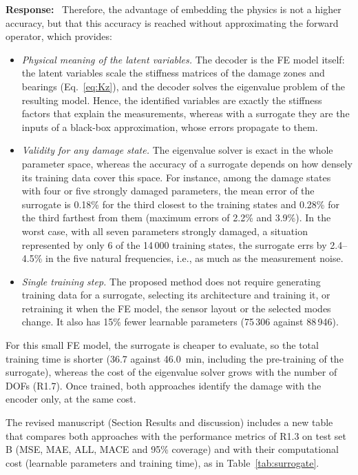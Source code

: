 \documentclass[11pt]{article}
\newenvironment{response}{\par\smallskip\noindent\color{resp}\textbf{Response:}\ }{\par}
\begin{document}
\begin{response}
	Therefore, the advantage of embedding the physics is not a higher accuracy, but that this accuracy is reached without approximating the forward operator, which provides:
	\begin{itemize}[leftmargin=*]
		\item \emph{Physical meaning of the latent variables.} The decoder is the FE model itself: the latent variables scale the stiffness matrices of the damage zones and bearings (Eq.~\eqref{eq:Kz}), and the decoder solves the eigenvalue problem of the resulting model. Hence, the identified variables are exactly the stiffness factors that explain the measurements, whereas with a surrogate they are the inputs of a black-box approximation, whose errors propagate to them.
		\item \emph{Validity for any damage state.} The eigenvalue solver is exact in the whole parameter space, whereas the accuracy of a surrogate depends on how densely its training data cover this space. For instance, among the damage states with four or five strongly damaged parameters, the mean error of the surrogate is 0.18\% for the third closest to the training states and 0.28\% for the third farthest from them (maximum errors of 2.2\% and 3.9\%). In the worst case, with all seven parameters strongly damaged, a situation represented by only 6 of the 14\,000 training states, the surrogate errs by 2.4--4.5\% in the five natural frequencies, i.e., as much as the measurement noise.
		\item \emph{Single training step.} The proposed method does not require generating training data for a surrogate, selecting its architecture and training it, or retraining it when the FE model, the sensor layout or the selected modes change. It also has 15\% fewer learnable parameters (75\,306 against 88\,946).
	\end{itemize}
	For this small FE model, the surrogate is cheaper to evaluate, so the total training time is shorter (36.7 against 46.0~min, including the pre-training of the surrogate), whereas the cost of the eigenvalue solver grows with the number of DOFs (R1.7).
	Once trained, both approaches identify the damage with the encoder only, at the same cost.
	
	The revised manuscript (Section Results and discussion) includes a new table that compares both approaches with the performance metrics of R1.3 on test set B (MSE, MAE, ALL, MACE and 95\% coverage) and with their computational cost (learnable parameters and training time), as in Table~\ref{tab:surrogate}.
	

\end{response}
\end{document}
